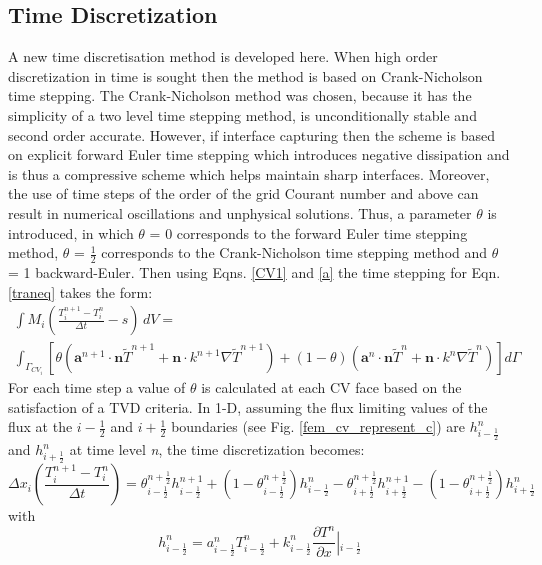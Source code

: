 \subsection{Time Discretization} \label{time_discretisation}
A new time discretisation method is developed here. When high order discretization in time
is sought then the method is based on Crank-Nicholson time stepping.  The Crank-Nicholson method was chosen, because it has the simplicity of a two level time stepping method, is unconditionally stable and second order accurate.
However, if interface capturing then the scheme is based on explicit forward Euler time stepping which
introduces negative dissipation and is thus a compressive scheme which helps maintain sharp interfaces.
Moreover, the use of time steps of the order of the grid Courant number and above can result in numerical oscillations and unphysical solutions. Thus, a parameter $\theta$ is introduced, in which $\theta$ = 0 corresponds to the forward Euler time stepping method,
$\theta$ = $\frac{1}{2}$ corresponds to the Crank-Nicholson time stepping method and $\theta$ = 1 backward-Euler.
Then using Eqns. \ref{CV1} and \ref{a} the time stepping for Eqn. \ref{traneq} takes the form:
\begin{eqnarray}
\int M_i \left( \frac{T_{i}^{n+1} -T_{i}^{n}}{\Delta t} - s \right) \,dV= \nonumber \\
\int_{\Gamma_{CV_{i}}} \left[\theta\left(\mathbf{a}^{n+1}\cdot \mathbf{n} \widetilde{T}^{n+1}
+\mathbf{n}\cdot k^{n+1}\nabla \widetilde{T}^{n+1}   \right)+\left(1-\theta\right)\left(\mathbf{a}^{n}\cdot \mathbf{n} \widetilde{T}^{n}
+\mathbf{n}\cdot k^{n}\nabla \widetilde{T}^{n}
 \right)  \right]d\Gamma
 \label{theta}
\end{eqnarray}
For each time step a value of $\theta$ is calculated at each CV face based on the satisfaction of a TVD criteria. In 1-D, assuming the flux limiting values of the flux at the $i-{\frac{1}{2}}$ and $i+{\frac{1}{2}}$ boundaries (see Fig. \ref{fem_cv_represent_c}) are $h^{n}_{i-{\frac{1}{2}}}$ and $h^{n}_{i+{\frac{1}{2}}}$ at time level \textit{n},  the time discretization becomes:
\begin{equation}
\Delta x_i \left( \frac{T_{i}^{n+1} - T_{i}^{n}}{\Delta t} \right)
= \theta_{i-\frac{1}{2}}^{n+{\frac{1}{2}}} h_{i-\frac{1}{2}}^{n+1}
+(1-\theta_{i-\frac{1}{2}}^{n+{\frac{1}{2}}}) h_{i-\frac{1}{2}}^n
-\theta_{i+\frac{1}{2}}^{n+\frac{1}{2}} h_{i+\frac{1}{2}}^{n+1}
-(1-\theta_{i+\frac{1}{2}}^{n+\frac{1}{2}}) h_{i+\frac{1}{2}}^n
\label{thetareq1}
\end{equation}
with
\begin{displaymath}
h_{i-\frac{1}{2}}^{n} = a_{i-\frac{1}{2}}^{n}
T_{i-\frac{1}{2}}^{n}
 +k_{i-\frac{1}{2}}^n \frac{\partial
T^n}{\partial x}\left\vert_{i-\frac{1}{2}}\right.
\end{displaymath}

